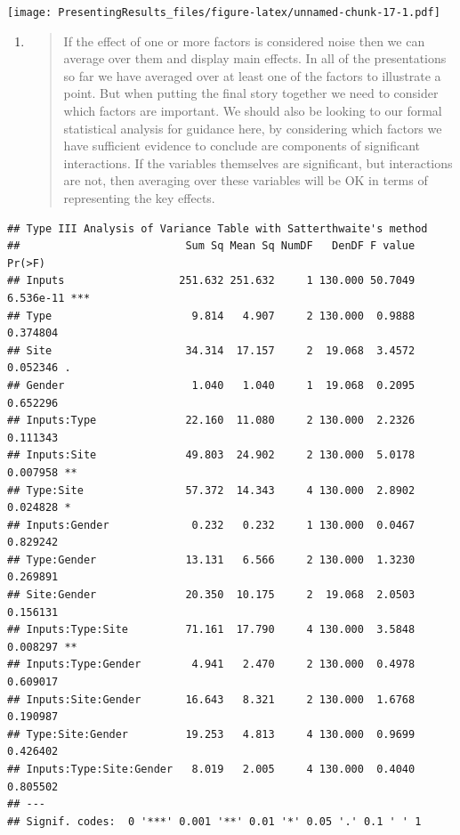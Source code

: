 \documentclass[
  titlepage]{book}
\begin{document}
\texttt{[image: PresentingResults\_files/figure-latex/unnamed-chunk-17-1.pdf]}

\begin{enumerate}
\def\labelenumi{\arabic{enumi}.}
\setcounter{enumi}{7}
\item
  \begin{quote}
  If the effect of one or more factors is considered noise then we can average over them and display main effects. In all of the presentations so far we have averaged over at least one of the factors to illustrate a point. But when putting the final story together we need to consider which factors are important. We should also be looking to our formal statistical analysis for guidance here, by considering which factors we have sufficient evidence to conclude are components of significant interactions. If the variables themselves are significant, but interactions are not, then averaging over these variables will be OK in terms of representing the key effects.
  \end{quote}
\end{enumerate}

\begin{verbatim}
## Type III Analysis of Variance Table with Satterthwaite's method
##                          Sum Sq Mean Sq NumDF   DenDF F value    Pr(>F)    
## Inputs                  251.632 251.632     1 130.000 50.7049 6.536e-11 ***
## Type                      9.814   4.907     2 130.000  0.9888  0.374804    
## Site                     34.314  17.157     2  19.068  3.4572  0.052346 .  
## Gender                    1.040   1.040     1  19.068  0.2095  0.652296    
## Inputs:Type              22.160  11.080     2 130.000  2.2326  0.111343    
## Inputs:Site              49.803  24.902     2 130.000  5.0178  0.007958 ** 
## Type:Site                57.372  14.343     4 130.000  2.8902  0.024828 *  
## Inputs:Gender             0.232   0.232     1 130.000  0.0467  0.829242    
## Type:Gender              13.131   6.566     2 130.000  1.3230  0.269891    
## Site:Gender              20.350  10.175     2  19.068  2.0503  0.156131    
## Inputs:Type:Site         71.161  17.790     4 130.000  3.5848  0.008297 ** 
## Inputs:Type:Gender        4.941   2.470     2 130.000  0.4978  0.609017    
## Inputs:Site:Gender       16.643   8.321     2 130.000  1.6768  0.190987    
## Type:Site:Gender         19.253   4.813     4 130.000  0.9699  0.426402    
## Inputs:Type:Site:Gender   8.019   2.005     4 130.000  0.4040  0.805502    
## ---
## Signif. codes:  0 '***' 0.001 '**' 0.01 '*' 0.05 '.' 0.1 ' ' 1
\end{verbatim}
\end{document}
